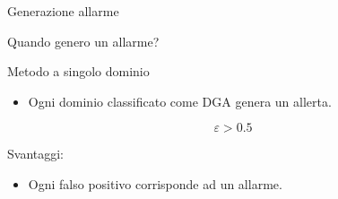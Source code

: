 



      

      
      



\begin{frame}{Generazione allarme}

  Quando genero un allarme?
  \vfill

  \begin{block}{Metodo a singolo dominio}
    \vfill
    \begin{itemize}
      \item Ogni dominio classificato come DGA genera un allerta.
    \end{itemize}

    \begin{equation*}
      \varepsilon > 0.5%
    \end{equation*}
    \vfill
  \end{block}
  \vfill
  Svantaggi:
  \begin{itemize}
    \item Ogni falso positivo corrisponde ad un allarme.
  \end{itemize}

\end{frame}


